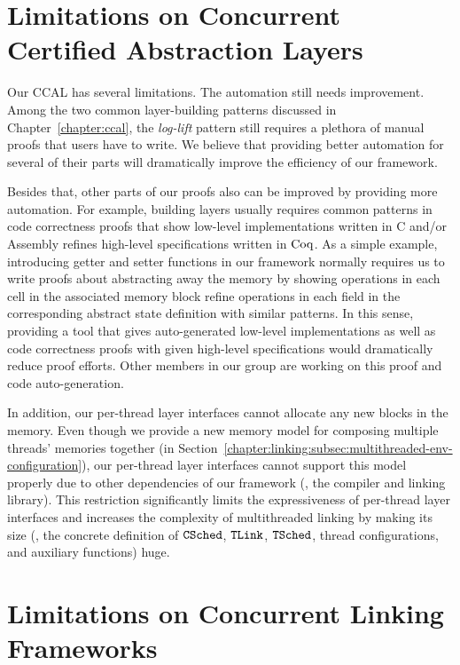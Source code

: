 \section{Limitations on Concurrent Certified Abstraction Layers}

Our CCAL has several limitations.
The automation still needs improvement. Among the two common layer-building patterns discussed in 
Chapter~\ref{chapter:ccal},
the \textit{log-lift} pattern still requires a plethora of manual proofs that users have to write. 
We believe that providing better automation for several of their parts will dramatically improve the efficiency of our framework.

Besides that, other parts of our proofs also can be improved by providing more automation. 
For example, building layers usually requires common patterns in code correctness proofs that show low-level implementations written in C and/or Assembly refines high-level specifications written in $\mathrm{Coq}$. 
As a simple example, introducing getter and setter functions in our framework normally requires us to write proofs about abstracting away the memory by showing operations in each cell in the associated memory block refine operations in each field in the corresponding abstract state definition with similar patterns.
In this sense, providing a tool that gives auto-generated low-level implementations as well as code correctness proofs with given high-level specifications would dramatically reduce proof efforts. 
Other members in our group are working on this proof and code auto-generation.

In addition, our per-thread layer interfaces cannot allocate any new blocks in the memory. Even though we provide a new memory 
model for composing multiple threads’ memories together 
(in  Section~\ref{chapter:linking:subsec:multithreaded-env-configuration}),
our per-thread layer interfaces cannot support this model properly due to other dependencies of our framework 
(\ie, the compiler and linking library). This restriction significantly limits the expressiveness of per-thread layer interfaces 
and increases the complexity of multithreaded linking by making its size  (\ie, the concrete definition of 
${{\mathrm{\texttt{CSched}}}}$, ${{\mathrm{\texttt{TLink}}}}$, ${{\mathrm{\texttt{TSched}}}}$,  thread configurations, and auxiliary functions) huge. 



\section{Limitations on Concurrent Linking Frameworks}


